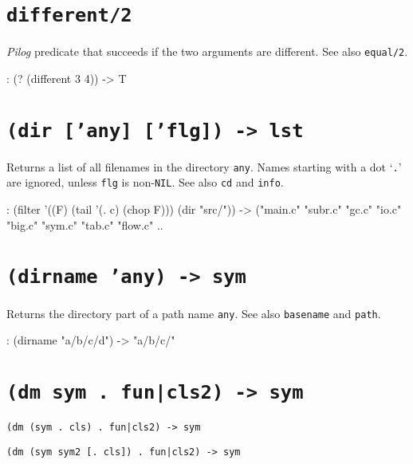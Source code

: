  
\section*{\texttt{different/2}}
\label{sec:func-ref-D-different/2}


\emph{Pilog} predicate that succeeds if the two arguments
are different. See also \texttt{equal/2}.


\begin{wideverbatim}
: (? (different 3 4))
-> T
\end{wideverbatim}

 
\section*{\texttt{(dir ['any] ['flg]) -> lst}}
\label{sec:func-ref-D-(dir ['any] ['flg]) -> lst}


Returns a list of all filenames in the directory \texttt{any}. Names
starting with a dot `\texttt{.}' are ignored, unless \texttt{flg} is
non-\texttt{NIL}. See also \texttt{cd} and \texttt{info}.


\begin{wideverbatim}
: (filter '((F) (tail '(. c) (chop F))) (dir "src/"))
-> ("main.c" "subr.c" "gc.c" "io.c" "big.c" "sym.c" "tab.c" "flow.c" ..
\end{wideverbatim}

 
\section*{\texttt{(dirname 'any) -> sym}}
\label{sec:func-ref-D-(dirname 'any) -> sym}


Returns the directory part of a path name \texttt{any}. See also \texttt{basename} and
\texttt{path}.


\begin{wideverbatim}
: (dirname "a/b/c/d")
-> "a/b/c/"
\end{wideverbatim}

 
\section*{\texttt{(dm sym . fun|cls2) -> sym}}
\label{sec:func-ref-D-(dm sym . fun|cls2) -> sym}


\texttt{(dm (sym . cls) . fun|cls2) -> sym}

\texttt{(dm (sym sym2 [. cls]) . fun|cls2) -> sym}

